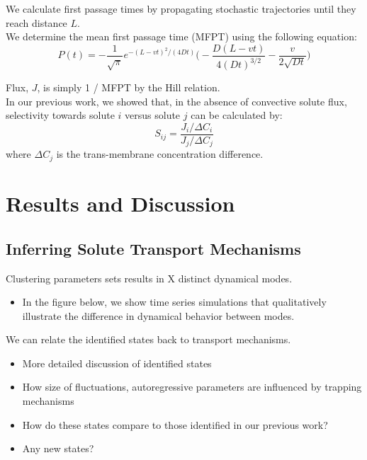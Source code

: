 \documentclass{article}
\begin{document}
  \noindent We calculate first passage times by propagating stochastic trajectories until they
  reach distance $L$. \\
  
  We determine the mean first passage time (MFPT) using the following equation:~\cite{cussler_diffusion:_2009}
  \begin{equation}
  P(t) = -\frac{1}{\sqrt{\pi}}e^{-(L - vt)^2 / (4Dt)}\bigg(-\frac{D(L - vt)}{4(Dt)^{3/2}} - \frac{v}{2\sqrt{Dt}}\bigg)
  \label{eqn:passage_times}
  \end{equation}
  
  \noindent Flux, $J$, is simply 1 / MFPT by the Hill relation.~\cite{hill_free_1989} \\
  
  In our previous work, we showed that, in the absence of convective solute flux, selectivity
  towards solute $i$ versus solute $j$ can be calculated by:  
  \begin{equation}
  S_{ij} = \frac{J_i / \Delta C_i}{J_j / \Delta C_j}
  \label{eqn:selectivity}
  \end{equation}
  where $\Delta C_j$ is the trans-membrane concentration difference.

  \section{Results and Discussion}
  \subsection{Inferring Solute Transport Mechanisms}
  
  Clustering parameters sets results in X distinct dynamical modes.
  \begin{itemize}
    \item In the figure below, we show time series simulations that qualitatively
    illustrate the difference in dynamical behavior between modes.
  \end{itemize}
   

  \noindent We can relate the identified states back to transport mechanisms.
  \begin{itemize}
  	\item More detailed discussion of identified states
  	\item How size of fluctuations, autoregressive parameters are influenced by trapping mechanisms
  	\item How do these states compare to those identified in our previous work?
  	\item Any new states?
  \end{itemize}
  
\end{document}
